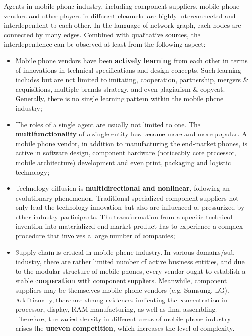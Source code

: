 \documentclass[utf8,english]{gradu3}
\begin{document}
Agents in mobile phone industry, including component suppliers, mobile phone vendors and other players in different channels, are highly interconnected and interdependent to each other. In the language of network graph, each nodes are connected by many edges. Combined with qualitative sources, the interdependence can be observed at least from the following aspect:

\begin{itemize}
\item Mobile phone vendors have been \textbf{actively learning} from each other in terms of innovations in technical specifications and design concepts. Such learning includes but are not limited to imitating, cooperation, partnership, mergers \& acquisitions, multiple brands strategy, and even plagiarism \& copycat. Generally, there is no single learning pattern within the mobile phone industry;
\item The roles of a single agent are usually not limited to one. The \textbf{multifunctionality} of a single entity has become more and more popular. A mobile phone vendor, in addition to manufacturing the end-market phones, is active in software design, component hardware (noticeably core processor, mobile architecture) development and even print, packaging and logistic technology;
\item Technology diffusion is \textbf{multidirectional and nonlinear}, following an evolutionary phenomenon. Traditional specialized component suppliers not only lead the technology innovation but also are influenced or pressurized by other industry participants. The transformation from a specific technical invention into materialized end-market product has to experience a complex procedure that involves a large number of companies;
\item Supply chain is critical in mobile phone industry. In various domains/sub-industry, there are rather limited number of active business entities, and due to the modular structure of mobile phones, every vendor ought to establish a stable \textbf{cooperation} with component suppliers. Meanwhile, component suppliers may be themselves mobile phone vendors (e.g. Samsung, LG). Additionally, there are strong evidences indicating the concentration in processor, display, RAM manufacturing, as well as final assembling. Therefore, the varied density in different areas of mobile phone industry arises the \textbf{uneven competition}, which increases the level of complexity.
\end{itemize}
\end{document}
